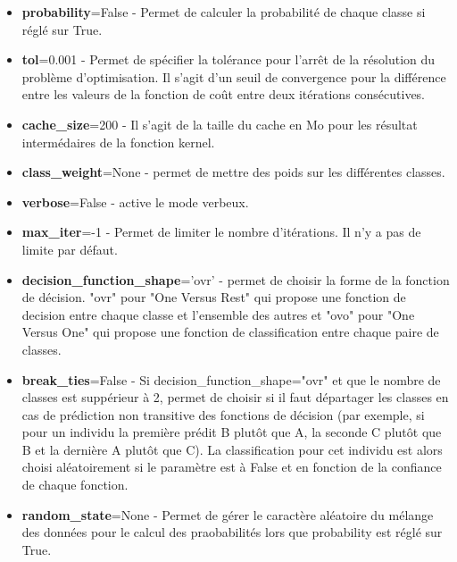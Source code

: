 \documentclass{ceri/sty/rapport}
\begin{document}
\begin{itemize}
    \item  \textbf{probability}=False - Permet de calculer la probabilité de chaque classe si réglé sur True.\\
    
    \item  \textbf{tol}=0.001 - Permet de spécifier la tolérance pour l'arrêt de la résolution du problème d'optimisation. Il s'agit d'un seuil de convergence pour la différence entre les valeurs de la fonction de coût entre deux itérations consécutives.\\
    
    \item  \textbf{cache\_size}=200 - Il s'agit de la taille du cache en Mo pour les résultat intermédaires de la fonction kernel.\\
    
    \item  \textbf{class\_weight}=None - permet de mettre des poids sur les différentes classes.\\
    
    \item  \textbf{verbose}=False - active le mode verbeux.\\
    
    \item  \textbf{max\_iter}=-1 - Permet de limiter le nombre d'itérations. Il n'y a pas de limite par défaut.\\
    
    \item \textbf{decision\_function\_shape}='ovr' - permet de choisir la forme de la fonction de décision. "ovr" pour "One Versus Rest" qui propose une fonction de decision entre chaque classe et l'ensemble des autres et "ovo" pour "One Versus One" qui propose une fonction de classification entre chaque paire de classes.\\
    
    \item  \textbf{break\_ties}=False - Si decision\_function\_shape="ovr" et que le nombre de classes est suppérieur à 2, permet de choisir si il faut départager les classes en cas de prédiction non transitive des fonctions de décision (par exemple, si pour un individu la première prédit B plutôt que A, la seconde C plutôt que B et la dernière A plutôt que C). La classification pour cet individu est alors choisi aléatoirement si le paramètre est à False et en fonction de la confiance de chaque fonction.\\
    
    \item  \textbf{random\_state}=None - Permet de gérer le caractère aléatoire du mélange des données pour le calcul des praobabilités lors que probability est réglé sur True.
\end{itemize}
\end{document}
